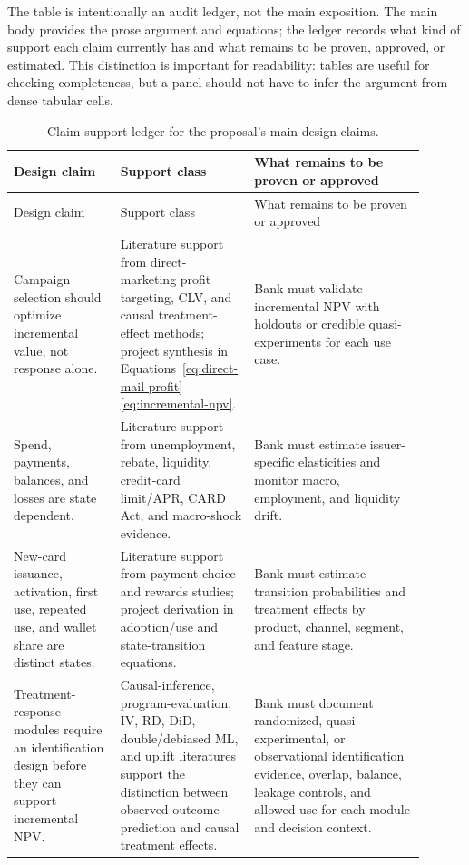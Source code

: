 \documentclass[11pt]{article}
\newcommand{\1}{\mathbf{1}}
\begin{document}
The table is intentionally an audit ledger, not the main exposition. The main
body provides the prose argument and equations; the ledger records what kind
of support each claim currently has and what remains to be proven, approved,
or estimated. This distinction is important for readability: tables are useful
for checking completeness, but a panel should not have to infer the argument
from dense tabular cells.

\begin{longtable}{p{0.25\linewidth}p{0.25\linewidth}p{0.40\linewidth}}
\caption{Claim-support ledger for the proposal's main design claims.}
\label{tab:claim-support}\\
\toprule
Design claim & Support class & What remains to be proven or approved \\
\midrule
\endfirsthead
\toprule
Design claim & Support class & What remains to be proven or approved \\
\midrule
\endhead
Campaign selection should optimize incremental value, not response alone.
  & Literature support from direct-marketing profit targeting, CLV, and causal
    treatment-effect methods; project synthesis in
    Equations~\eqref{eq:direct-mail-profit}--\eqref{eq:incremental-npv}.
  & Bank must validate incremental NPV with holdouts or credible
    quasi-experiments for each use case. \\
Spend, payments, balances, and losses are state dependent.
  & Literature support from unemployment, rebate, liquidity, credit-card
    limit/APR, CARD Act, and macro-shock evidence.
  & Bank must estimate issuer-specific elasticities and monitor macro,
    employment, and liquidity drift. \\
New-card issuance, activation, first use, repeated use, and wallet share are
distinct states.
  & Literature support from payment-choice and rewards studies; project
    derivation in adoption/use and state-transition equations.
  & Bank must estimate transition probabilities and treatment effects by
    product, channel, segment, and feature stage. \\
Treatment-response modules require an identification design before they can
support incremental NPV.
  & Causal-inference, program-evaluation, IV, RD, DiD, double/debiased ML, and
    uplift literatures support the distinction between observed-outcome
    prediction and causal treatment effects.
  & Bank must document randomized, quasi-experimental, or observational
    identification evidence, overlap, balance, leakage controls, and allowed
    use for each module and decision context. \\

\end{longtable}
\end{document}
